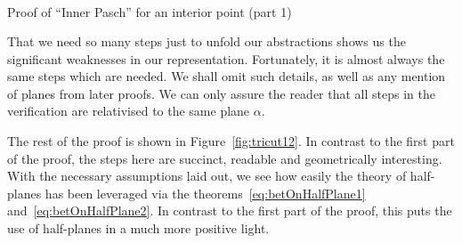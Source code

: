 \begin{boxedfigure}
\begin{align*}
\end{align*}
\caption{Proof of ``Inner Pasch'' for an interior point (part 1)}
\label{fig:tricut11}
\end{boxedfigure}

That we need so many steps just to unfold our abstractions shows us the significant weaknesses in our representation. Fortunately, it is almost always the same steps which are needed. We shall omit such details, as well as any mention of planes from later proofs. We can only assure the reader that all steps in the verification are relativised to the same plane $\alpha$.

The rest of the proof is shown in Figure~\ref{fig:tricut12}. In contrast to the first part of the proof, the steps here are succinct, readable and geometrically interesting. With the necessary assumptions laid out, we see how easily the theory of half-planes has been leveraged via the theorems~\ref{eq:betOnHalfPlane1} and~\ref{eq:betOnHalfPlane2}. In contrast to the first part of the proof, this puts the use of half-planes in a much more positive light. 

